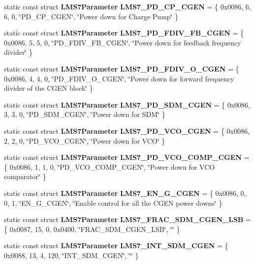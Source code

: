 \begin{DoxyCompactItemize}
\item 
static const struct {\bf L\+M\+S7\+Parameter} {\bf L\+M\+S7\+\_\+\+P\+D\+\_\+\+C\+P\+\_\+\+C\+G\+EN} = \{ 0x0086, 6, 6, 0, \char`\"{}\+P\+D\+\_\+\+C\+P\+\_\+\+C\+G\+E\+N\char`\"{}, \char`\"{}\+Power down for Charge Pump\char`\"{} \}
\item 
static const struct {\bf L\+M\+S7\+Parameter} {\bf L\+M\+S7\+\_\+\+P\+D\+\_\+\+F\+D\+I\+V\+\_\+\+F\+B\+\_\+\+C\+G\+EN} = \{ 0x0086, 5, 5, 0, \char`\"{}\+P\+D\+\_\+\+F\+D\+I\+V\+\_\+\+F\+B\+\_\+\+C\+G\+E\+N\char`\"{}, \char`\"{}\+Power down for feedback frequency divider\char`\"{} \}
\item 
static const struct {\bf L\+M\+S7\+Parameter} {\bf L\+M\+S7\+\_\+\+P\+D\+\_\+\+F\+D\+I\+V\+\_\+\+O\+\_\+\+C\+G\+EN} = \{ 0x0086, 4, 4, 0, \char`\"{}\+P\+D\+\_\+\+F\+D\+I\+V\+\_\+\+O\+\_\+\+C\+G\+E\+N\char`\"{}, \char`\"{}\+Power down for forward frequency divider of the C\+G\+E\+N block\char`\"{} \}
\item 
static const struct {\bf L\+M\+S7\+Parameter} {\bf L\+M\+S7\+\_\+\+P\+D\+\_\+\+S\+D\+M\+\_\+\+C\+G\+EN} = \{ 0x0086, 3, 3, 0, \char`\"{}\+P\+D\+\_\+\+S\+D\+M\+\_\+\+C\+G\+E\+N\char`\"{}, \char`\"{}\+Power down for S\+D\+M\char`\"{} \}
\item 
static const struct {\bf L\+M\+S7\+Parameter} {\bf L\+M\+S7\+\_\+\+P\+D\+\_\+\+V\+C\+O\+\_\+\+C\+G\+EN} = \{ 0x0086, 2, 2, 0, \char`\"{}\+P\+D\+\_\+\+V\+C\+O\+\_\+\+C\+G\+E\+N\char`\"{}, \char`\"{}\+Power down for V\+C\+O\char`\"{} \}
\item 
static const struct {\bf L\+M\+S7\+Parameter} {\bf L\+M\+S7\+\_\+\+P\+D\+\_\+\+V\+C\+O\+\_\+\+C\+O\+M\+P\+\_\+\+C\+G\+EN} = \{ 0x0086, 1, 1, 0, \char`\"{}\+P\+D\+\_\+\+V\+C\+O\+\_\+\+C\+O\+M\+P\+\_\+\+C\+G\+E\+N\char`\"{}, \char`\"{}\+Power down for V\+C\+O comparator\char`\"{} \}
\item 
static const struct {\bf L\+M\+S7\+Parameter} {\bf L\+M\+S7\+\_\+\+E\+N\+\_\+\+G\+\_\+\+C\+G\+EN} = \{ 0x0086, 0, 0, 1, \char`\"{}\+E\+N\+\_\+\+G\+\_\+\+C\+G\+E\+N\char`\"{}, \char`\"{}\+Enable control for all the C\+G\+E\+N power downs\char`\"{} \}
\item 
static const struct {\bf L\+M\+S7\+Parameter} {\bf L\+M\+S7\+\_\+\+F\+R\+A\+C\+\_\+\+S\+D\+M\+\_\+\+C\+G\+E\+N\+\_\+\+L\+SB} = \{ 0x0087, 15, 0, 0x0400, \char`\"{}\+F\+R\+A\+C\+\_\+\+S\+D\+M\+\_\+\+C\+G\+E\+N\+\_\+\+L\+S\+B\char`\"{}, \char`\"{}\char`\"{} \}
\item 
static const struct {\bf L\+M\+S7\+Parameter} {\bf L\+M\+S7\+\_\+\+I\+N\+T\+\_\+\+S\+D\+M\+\_\+\+C\+G\+EN} = \{ 0x0088, 13, 4, 120, \char`\"{}\+I\+N\+T\+\_\+\+S\+D\+M\+\_\+\+C\+G\+E\+N\char`\"{}, \char`\"{}\char`\"{} \}

\end{DoxyCompactItemize}
